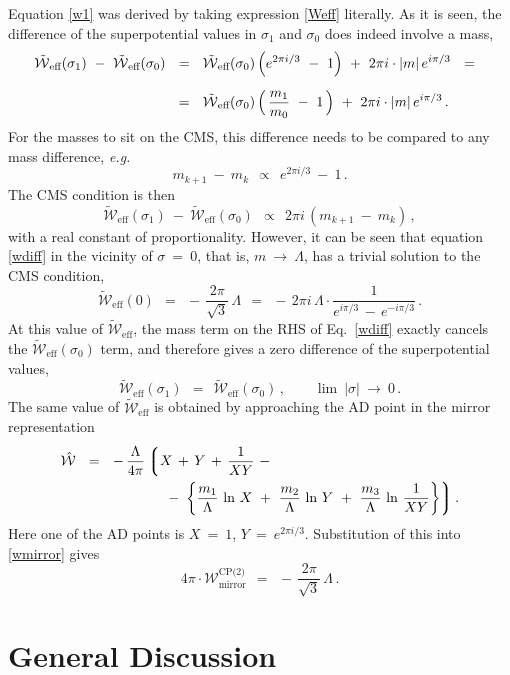 \documentclass[12pt]{article}
\def\beq{\begin{equation}}
\def\eeq{\end{equation}}
\newcommand{\mc}[1]{\mathcal{#1}}
\newcommand{\lgr}{\left\lgroup}
\newcommand{\rgr}{\right\rgroup}
\newcommand{\ww}{\tilde{\mc{W}}{}_\text{eff}}
\begin{document}
	Equation \eqref{w1} was derived by taking expression \eqref{Weff} literally. 
	As it is seen, the difference of the superpotential values in $ \sigma_1 $ and
	$ \sigma_0 $ does indeed involve a mass, 
\begin{align}
%
\notag
	\ww (\sigma_1) ~-~ \ww (\sigma_0) & ~~=~~ 
	\ww (\sigma_0) \, \Big( e^{2\pi i /3} ~-~ 1 \Big)  ~+~  2\pi i \cdot |m|\,e^{ i\pi/3 }
	~~=~~ \\[2mm]
%
\label{wdiff}
	& 
	~~=~~
	\ww (\sigma_0) \, \Big(\, \frac{m_1}{m_0}  ~-~ 1 \,\Big)  ~+~  2\pi i \cdot |m|\,e^{ i\pi/3 }\,.
\end{align}
	For the masses to sit on the CMS, this difference needs to be compared to any
	mass difference, {\it e.g.}
\beq
	m_{k+1} ~-~ m_k  ~~\propto~~ e^{2 \pi i/ 3} ~-~ 1\,.
\eeq
	The CMS condition is then
\beq
	\ww (\sigma_1) ~-~ \ww(\sigma_0) ~~\propto~~ 2\pi i\, ( m_{k+1} ~-~ m_k )\,,
\eeq
	with a real constant of proportionality.
	However, it can be seen that equation \eqref{wdiff} in the vicinity of $ \sigma ~=~ 0 $, 
	that is,  $ m ~\to~ \Lambda $, has a trivial solution to the CMS condition,
\beq
	\ww (0) ~~=~~ -\, \frac{2\pi}{\sqrt{3}}\, \Lambda 
		~~=~~ -\, 2\pi i \, \Lambda \cdot \frac{1}{e^{i\pi/3} \,-\, e^{-i\pi/3}}\,.
\eeq
	At this value of $ \ww $, the mass term on the RHS of Eq.~\eqref{wdiff} exactly 
	cancels the $ \ww( \sigma_0 ) $ term, 
	and therefore gives a zero difference of the superpotential values,
\beq
	\ww ( \sigma_1 ) ~~=~~ \ww( \sigma_0 )\,, \qquad \lim ~|\sigma| ~\to~ 0\,.
\eeq
	The same value of $ \ww $ is obtained by approaching the AD point in the mirror representation
\begin{align}
\notag
%
	\hat{\mc{W}} & ~~=~~
		-\, \frac{\Lambda}{4\pi} 
			\lgr   X \,+\, Y \,+\, \frac{1}{X Y}  ~-~  \right. \\
%
\label{wmirror}
	&
	\left.
	\qquad\qquad\qquad
			 ~-~  \left\{ \frac{m_1}{\Lambda}\, \ln\, X ~+~
				      \frac{m_2}{\Lambda}\, \ln\, Y ~+~
				      \frac{m_3}{\Lambda}\, 
					\ln\, \frac{1}{X Y} \right\} \rgr.
\end{align}
	Here one of the AD points is $ X ~=~ 1 $, $ Y ~=~ e^{2\pi i /3} $.
	Substitution of this into \eqref{wmirror} gives
\beq
	4\pi \cdot
	\mc{W}_\text{mirror}^\text{CP(2)} ~~=~~ -\, \frac{2\pi}{\sqrt{3}}\, \Lambda\,.
\eeq

\section*{General Discussion}
\end{document}
